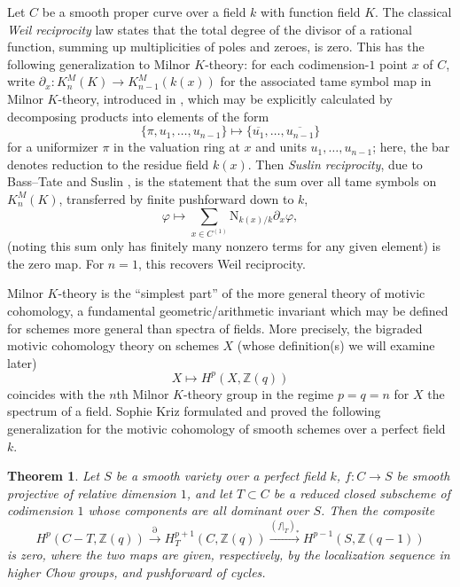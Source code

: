 \documentclass[a4paper,reqno,11pt]{amsart}
\theoremstyle{plain}
\newtheorem{theorem}{Theorem}[section]
\theoremstyle{definition}
\theoremstyle{remark}
\newcommand{\Z}{\mathbb{Z}}
\begin{document}
Let $C$ be a smooth proper curve over a field $k$ with function field $K$. The classical \emph{Weil reciprocity} law states that the total degree of the divisor of a rational function, summing up multiplicities of poles and zeroes, is zero. This has the following generalization to Milnor $K$-theory: for each codimension-$1$ point $x$ of $C$, write $\partial_x: K_n^M(K) \to K_{n-1}^M(k(x))$ for the associated tame symbol map in Milnor $K$-theory, introduced in \cite{Mil}, which may be explicitly calculated by decomposing products into elements of the form
\begin{equation} \label{eq:cup}
\{\pi, u_1, \ldots, u_{n-1} \} \mapsto \{\overline{u_1},\ldots, \overline{u_{n-1}}\}
\end{equation}
for a uniformizer $\pi$ in the valuation ring at $x$ and units $u_1,\ldots, u_{n-1}$; here, the bar denotes reduction to the residue field $k(x)$. Then \emph{Suslin reciprocity}, due to Bass--Tate \cite{BaTa} and Suslin \cite{Sus}, is the statement that the sum over all tame symbols on $K_n^M(K)$, transferred by finite pushforward down to $k$,
\begin{equation} \label{eq:suslin}
\varphi\mapsto \sum_{x\in C^{(1)}} \mathrm{N}_{k(x)/k}\partial_x \varphi,
\end{equation}
(noting this sum only has finitely many nonzero terms for any given element) is the zero map. For $n=1$, this recovers Weil reciprocity. 

Milnor $K$-theory is the ``simplest part'' of the more general theory of motivic cohomology, a fundamental geometric/arithmetic invariant which may be defined for schemes more general than spectra of fields. More precisely, the bigraded motivic cohomology theory on schemes $X$ (whose definition(s) we will examine later)
\[
X\mapsto H^p(X, \Z(q))
\]
coincides with the $n$th Milnor $K$-theory group in the regime $p=q=n$ for $X$ the spectrum of a field. Sophie Kriz \cite{Kr} formulated and proved the following generalization for the motivic cohomology of smooth schemes over a perfect field $k$.

\begin{theorem} \label{thm:kriz}
    Let $S$ be a smooth variety over a perfect field $k$, $f:C\to S$ be smooth projective of relative dimension $1$, and let $T\subset C$ be a reduced closed subscheme of codimension $1$ whose components are all dominant over $S$. Then the composite
    \[
    H^p(C-T, \Z(q)) \xrightarrow{\partial} H^{p+1}_T(C, \Z(q)) \xrightarrow{(f|_T)_*} H^{p-1}(S, \Z(q-1))
    \]
    is zero, where the two maps are given, respectively, by the localization sequence in higher Chow groups, and pushforward of cycles.
\end{theorem}
\end{document}
